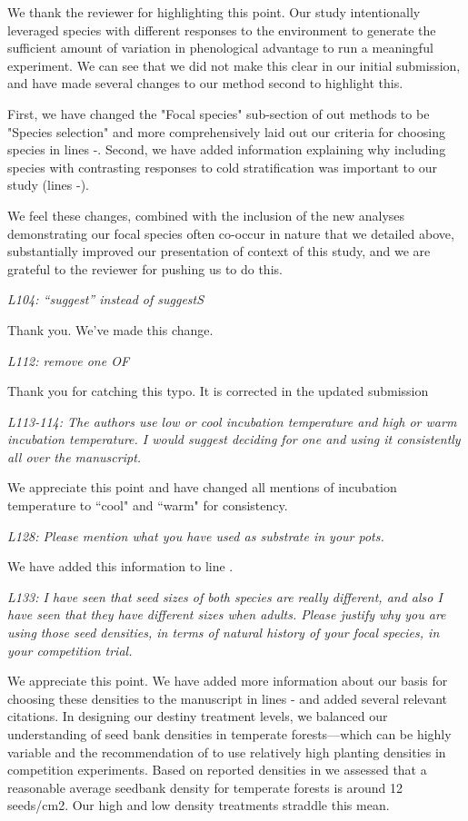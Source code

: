 \documentclass[11pt]{article}
\begin{document}
We thank the reviewer for highlighting this point. Our study intentionally leveraged species with different responses to the environment to generate the sufficient amount of variation in phenological advantage to run a meaningful experiment. We can see that we did not make this clear in our initial submission, and have made several changes to our method second to highlight this.

First, we have changed the "Focal species" sub-section of out methods to be "Species selection" and more comprehensively laid out our criteria for choosing species in lines -. Second, we have added information explaining why including species with contrasting responses to cold stratification  was important to our study (lines -).

We feel these changes, combined with the inclusion of the new analyses demonstrating our focal species often co-occur in nature that we detailed above, substantially improved our presentation of context of this study, and we are grateful to the reviewer for pushing us to do this.

\emph{L104: “suggest” instead of suggestS}

Thank you. We've made this change.

\emph{L112: remove one OF}

Thank you for catching this typo. It is corrected in the updated submission

\emph{L113-114: The authors use low or cool incubation temperature and high or warm incubation temperature. I would suggest deciding for one and using it consistently all over the manuscript.}

We appreciate this point and have changed all mentions of incubation temperature to ``cool" and ``warm" for consistency. 

\emph{L128: Please mention what you have used as substrate in your pots.}

We have added this information to line . 

\emph{L133: I have seen that seed sizes of both species are really different, and also I have seen that they have different sizes when adults. Please justify why you are using those seed densities, in terms of natural history of your focal species, in your competition trial.}

We appreciate this point. We have added more information about our basis for choosing these densities to the manuscript in lines - and added several relevant citations. In designing our destiny treatment levels, we balanced our understanding of seed bank densities in temperate forests---which can be highly variable \citep{Leckie:2000tb,Bossuyt:2002un,Decocq:2004tq} and the recommendation of \citet{Inouye2001} to use relatively high planting densities in competition experiments. Based on reported densities in \citet{Leckie:2000tb,Bossuyt:2002un,Decocq:2004tq} we assessed that a reasonable average seedbank density for temperate forests is around 12 seeds/cm2. Our high and low density treatments straddle this mean.
\end{document}
